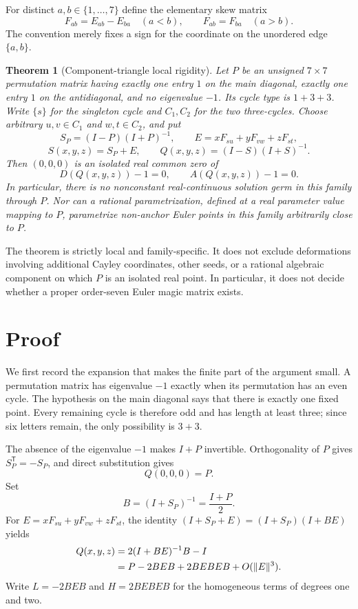 \documentclass[11pt]{article}
\newtheorem{theorem}{Theorem}
\newcommand{\norm}[1]{\lVert #1\rVert}
\begin{document}
For distinct $a,b\in\{1,\ldots,7\}$ define the elementary skew matrix
\[
 F_{ab}=E_{ab}-E_{ba}\quad(a<b),
 \qquad F_{ab}=F_{ba}\quad(a>b).
\]
The convention merely fixes a sign for the coordinate on the unordered edge
$\{a,b\}$.

\begin{theorem}[Component-triangle local rigidity]\label{thm:main}
Let $P$ be an unsigned $7\times7$ permutation matrix having exactly one
entry $1$ on the main diagonal, exactly one entry $1$ on the antidiagonal,
and no eigenvalue $-1$.  Its cycle type is $1+3+3$.  Write $\{s\}$ for the
singleton cycle and $C_1,C_2$ for the two three-cycles.  Choose arbitrary
$u,v\in C_1$ and $w,t\in C_2$, and put
\[
 S_P=(I-P)(I+P)^{-1},\qquad
 E=xF_{su}+yF_{vw}+zF_{st},
\]
\[
 S(x,y,z)=S_P+E,\qquad
 Q(x,y,z)=(I-S)(I+S)^{-1}.
\]
Then $(0,0,0)$ is an isolated real common zero of
\[
 D(Q(x,y,z))-1=0,
 \qquad
 A(Q(x,y,z))-1=0.
\]
In particular, there is no nonconstant real-continuous solution germ in this
family through $P$.  Nor can a rational parametrization, defined at a real
parameter value mapping to $P$, parametrize non-anchor Euler points in this
family arbitrarily close to $P$.
\end{theorem}

The theorem is strictly local and family-specific.  It does not exclude
deformations involving additional Cayley coordinates, other seeds, or a
rational algebraic component on which $P$ is an isolated real point.  In
particular, it does not decide whether a proper order-seven Euler magic
matrix exists.

\section{Proof}

We first record the expansion that makes the finite part of the argument
small.  A permutation matrix has eigenvalue $-1$ exactly when its permutation
has an even cycle.  The hypothesis on the main diagonal says that there is
exactly one fixed point.  Every remaining cycle is therefore odd and has
length at least three; since six letters remain, the only possibility is
$3+3$.

The absence of the eigenvalue $-1$ makes $I+P$ invertible.  Orthogonality of
$P$ gives $S_P^{\mathsf T}=-S_P$, and direct substitution gives
\[
 Q(0,0,0)=P.
\]
Set
\[
 B=(I+S_P)^{-1}=\frac{I+P}{2}.
\]
For $E=xF_{su}+yF_{vw}+zF_{st}$, the identity
$(I+S_P+E)=(I+S_P)(I+BE)$ yields
\begin{align}
 Q(x,y,z)
 &=2(I+BE)^{-1}B-I \notag\\
 &=P-2BEB+2BEBEB+O(\norm{E}^3).\label{eq:taylor}
\end{align}
Write $L=-2BEB$ and $H=2BEBEB$ for the homogeneous terms of degrees one
and two.
\end{document}
